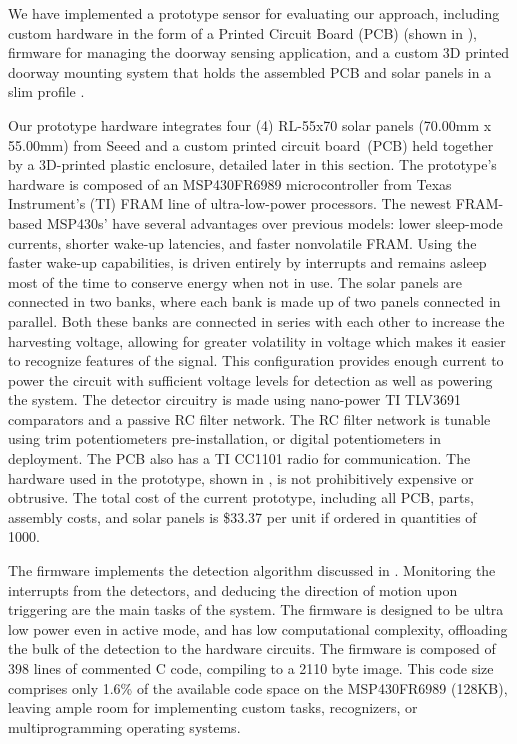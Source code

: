 We have implemented a prototype \sysname sensor for evaluating our approach, including custom hardware in the form of a Printed Circuit Board (PCB) (shown in ), firmware for managing the doorway sensing application, and a custom 3D printed doorway mounting system that holds the assembled PCB and solar panels in a slim profile .

 Our prototype hardware integrates four (4) RL-55x70 solar panels (70.00mm x 55.00mm) from Seeed and a custom printed circuit board~(PCB) held together by a 3D-printed plastic enclosure, detailed later in this section.
The prototype's hardware is composed of an MSP430FR6989 microcontroller from Texas Instrument's (TI) FRAM line of ultra-low-power processors.
The newest FRAM-based MSP430s' have several advantages over previous models: lower sleep-mode currents, shorter wake-up latencies, and faster nonvolatile FRAM.
Using the faster wake-up capabilities, \sysname is driven entirely by interrupts and remains asleep most of the time to conserve energy when not in use.
The solar panels are connected in two banks, where each bank is made up of two panels connected in parallel.
Both these banks are connected in series with each other to increase the harvesting voltage, allowing for greater volatility in voltage which makes it easier to recognize features of the signal.
This configuration provides enough current to power the circuit with sufficient voltage levels for detection as well as powering the system.
The detector circuitry is made using nano-power TI TLV3691 comparators and a passive RC filter network. The RC filter network is tunable using trim potentiometers pre-installation, or digital potentiometers in deployment.
The \sysname PCB also has a TI CC1101 radio for communication.
The hardware used in the \sysname prototype, shown in , is not prohibitively expensive or obtrusive.
The total cost of the current prototype, including all PCB, parts, assembly costs, and solar panels is \$33.37 per unit if ordered in quantities of 1000.

The \sysname firmware implements the detection algorithm discussed in .
Monitoring the interrupts from the detectors, and deducing the direction of motion upon triggering are the main tasks of the system.
The firmware is designed to be ultra low power even in active mode, and has low computational complexity, offloading the bulk of the detection to the hardware circuits.
The \sysname firmware is composed of 398 lines of commented C code, compiling to a 2110 byte image. This code size comprises only 1.6\% of the available code space on the MSP430FR6989 (128KB), leaving ample room for implementing custom tasks, recognizers, or multiprogramming operating systems.


